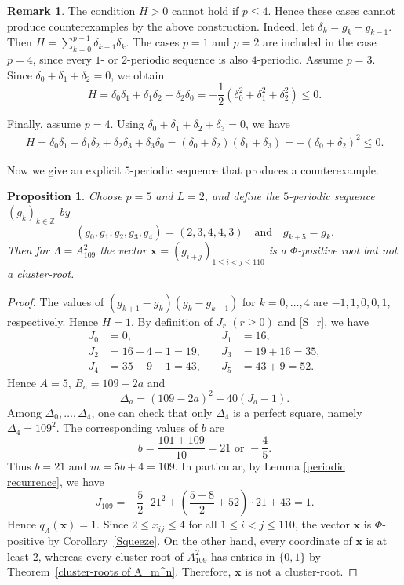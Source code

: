 \documentclass[11pt,a4paper]{amsart}
\newtheorem{proposition}[theorem]{Proposition}
\theoremstyle{definition}
\newtheorem{remark}[theorem]{Remark}
\numberwithin{equation}{section}
\newcommand{\x}{\mathbf{x}}
\newcommand{\0}{\mathbf{0}}
\begin{document}
	\begin{remark}
		The condition $H>0$ cannot hold if  $p\le4$. Hence these cases cannot produce counterexamples by the
		above construction. Indeed, 	
		let
		$
		\delta_k=g_k-g_{k-1}.
		$
		Then
		$
		H=\sum_{k=0}^{p-1}\delta_{k+1}\delta_k.
		$			The cases $p=1$ and $p=2$ are included in the case $p=4$,
		since every $1$- or $2$-periodic sequence is also $4$-periodic. 		
		Assume  $p=3$. Since
		$\delta_0+\delta_1+\delta_2=0$, we obtain
		\[
		H
		=\delta_0\delta_1+\delta_1\delta_2+\delta_2\delta_0
		=-\frac12\left(\delta_0^2+\delta_1^2+\delta_2^2\right)
		\le0.
		\] 
				
		Finally, assume $p=4$. Using
		$\delta_0+\delta_1+\delta_2+\delta_3=0$, we have
		\[
		\begin{aligned}
			H
			=\delta_0\delta_1+\delta_1\delta_2
			+\delta_2\delta_3+\delta_3\delta_0
			=(\delta_0+\delta_2)(\delta_1+\delta_3)
			=-(\delta_0+\delta_2)^2\le0.
		\end{aligned}
		\]
	\end{remark}
	
		Now we give an explicit $5$-periodic sequence
		that produces a counterexample.
	
	\begin{proposition}\label{counterexample1}
		Choose $p=5$ and $L=2$, and define the $5$-periodic sequence
		$(g_k)_{k\in\mathbb Z}$ by
		\[
		(g_0,g_1,g_2,g_3,g_4)=(2,3,4,4,3) \quad \text{and}
		\quad g_{k+5}=g_k.
		\] Then for $\Lambda=A_{109}^2$ the vector 
		$\x=(g_{i+j})_{1\le i<j\le110}$ is a $\Phi$-positive root but not a cluster-root. 
		\end{proposition}
		\begin{proof}
	 The values of $(g_{k+1}-g_k)(g_k-g_{k-1})$ for $k=0,\dots,4$
				are $-1,1,0,0,1$, respectively. Hence $H=1$.
		By definition of $J_r$ $(r\ge 0)$ and \eqref{S_r}, we have
		\[
		\begin{aligned}
			J_0&=0, &\quad J_1&=16,\\
			J_2&=16+4-1=19, &\quad
			J_3&=19+16=35,\\
			J_4&=35+9-1=43, &\quad
			J_5&=43+9=52.
		\end{aligned}
		\]
		Hence $A=5$, $B_a=109-2a$ and $$\Delta_a=(109-2a)^2+40(J_a-1).$$ 		
			Among $\Delta_0,\dots,\Delta_4$, one can check that only $\Delta_4$ is a perfect square, namely $\Delta_4=109^2$.
		The corresponding values of $b$ are
		\[
		b=\frac{101\pm109}{10}=21\text{ or }-\frac45.
		\]
		Thus $b=21$ and $m=5b+4=109$. In particular, by Lemma \ref{periodic recurrence}, we have
		\[
			J_{109}
			=-\frac{5}{2}\cdot 21^2
			+\left(\frac{5-8}{2}+52\right)\cdot 21+43
			=1.
		\]
		Hence $q_\Lambda(\x)=1$. 
		Since $2\le x_{ij}\le4$ for all $1\le i<j\le110$,
		the vector $\x$ is $\Phi$-positive by Corollary~\ref{Squeeze}. 
		On the other hand, every coordinate of $\x$ is at least $2$,
		whereas every cluster-root of $A_{109}^2$ has entries in
		$\{0,1\}$ by Theorem~\ref{cluster-roots of A_m^n}.
		Therefore, $\x$ is not a cluster-root.
	\end{proof}
\end{document}
